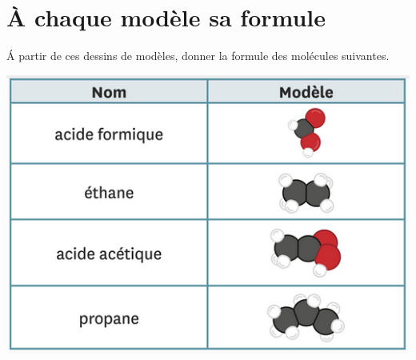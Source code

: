 \section{À chaque modèle sa formule}
\begin{questions}
	\question \'A partir de ces dessins de modèles, donner la formule des molécules suivantes.

	\begin{center}
		\includegraphics[scale=0.6]{img/exemples}
	\end{center}
	\fillwithdottedlines{2cm}
	
\end{questions}